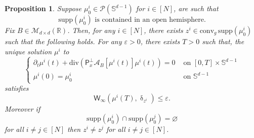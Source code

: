 \documentclass[a4paper,11pt]{article}
\theoremstyle{plain}
\newtheorem{proposition}[theorem]{Proposition}
\newcommand{\supp}{\mathrm{supp}}
\newcommand{\proj}{\bm{\mathsf{P}}^\perp}
\newcommand{\conv}{\mathrm{conv}}
\newcommand{\dive}{\mathrm{div}}
\renewcommand{\S}{\mathbb{S}^{d-1}}
\newcommand{\bB}{\bm{\mathit{B}}}
\renewcommand{\leq}{\leqslant}
\numberwithin{equation}{section}
\begin{document}
\begin{proposition} \label{prop: targets.atoms}
Suppose $\mu_0^i\in \mathscr{P}(\S)$ for $i\in[N]$, are such that 
\begin{equation*}
\supp(\mu_0^i)\text{ is contained in an open hemisphere.}
\end{equation*} 
Fix $\bB\in \mathscr{M}_{d\times d}(\mathbb{R})$. Then, for any $i\in[N]$, there exists $z^i\in \conv_g\,\supp(\mu_0^i)$ such that the following holds. For any $\varepsilon>0$, there exists $T>0$ such that, the unique solution $\mu^i$ to
\begin{equation} \label{eq: cauchy.pb.W=0}
\begin{cases}
\partial_t \mu^i(t)+\dive\left(\proj_x\mathscr{A}_{\bB}[\mu^i(t)]\mu^i(t)\right)=0 &\text{ on } [0,T]\times\S\\
\mu^i(0)=\mu_0^i &\text{ on } \S   
\end{cases}
\end{equation}
satisfies
\begin{equation*}
\mathsf{W}_{\infty}\left(\mu^i(T),\updelta_{z^i}\right)\leq \varepsilon.
\end{equation*}
Moreover if
\begin{equation*}
\supp(\mu_0^i)\cap \supp(\mu_0^j)=\varnothing
\end{equation*}
for all $i\neq j\in[N]$ then $z^i\neq z^j$ for all $i\neq j\in[N]$.
\end{proposition}
\end{document}
